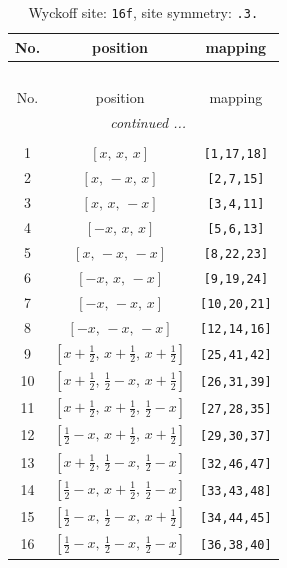 \documentclass[fleqn,8pt]{jsarticle}
\begin{document}
\begin{longtable}{ccc}
\caption{Wyckoff site: {\tt 16f}, site symmetry: {\tt .3.}}
 \\
 \hline \hline
No. & position & mapping \\ \hline \endfirsthead

\multicolumn{2}{l}{\tablename\ \thetable{}} \\
 \hline \hline
No. & position & mapping \\ \hline \endhead

 \hline \hline
\multicolumn{2}{r}{\footnotesize\it continued ...} \\ \endfoot

 \hline \hline
\multicolumn{2}{r}{} \\ \endlastfoot

1 & $\left[ x,\, x,\, x \right]$ & {\tt [1,17,18]} \\ \hline
2 & $\left[ x,\, - x,\, x \right]$ & {\tt [2,7,15]} \\ \hline
3 & $\left[ x,\, x,\, - x \right]$ & {\tt [3,4,11]} \\ \hline
4 & $\left[ - x,\, x,\, x \right]$ & {\tt [5,6,13]} \\ \hline
5 & $\left[ x,\, - x,\, - x \right]$ & {\tt [8,22,23]} \\ \hline
6 & $\left[ - x,\, x,\, - x \right]$ & {\tt [9,19,24]} \\ \hline
7 & $\left[ - x,\, - x,\, x \right]$ & {\tt [10,20,21]} \\ \hline
8 & $\left[ - x,\, - x,\, - x \right]$ & {\tt [12,14,16]} \\ \hline
9 & $\left[ x + \frac{1}{2},\, x + \frac{1}{2},\, x + \frac{1}{2} \right]$ & {\tt [25,41,42]} \\ \hline
10 & $\left[ x + \frac{1}{2},\, \frac{1}{2} - x,\, x + \frac{1}{2} \right]$ & {\tt [26,31,39]} \\ \hline
11 & $\left[ x + \frac{1}{2},\, x + \frac{1}{2},\, \frac{1}{2} - x \right]$ & {\tt [27,28,35]} \\ \hline
12 & $\left[ \frac{1}{2} - x,\, x + \frac{1}{2},\, x + \frac{1}{2} \right]$ & {\tt [29,30,37]} \\ \hline
13 & $\left[ x + \frac{1}{2},\, \frac{1}{2} - x,\, \frac{1}{2} - x \right]$ & {\tt [32,46,47]} \\ \hline
14 & $\left[ \frac{1}{2} - x,\, x + \frac{1}{2},\, \frac{1}{2} - x \right]$ & {\tt [33,43,48]} \\ \hline
15 & $\left[ \frac{1}{2} - x,\, \frac{1}{2} - x,\, x + \frac{1}{2} \right]$ & {\tt [34,44,45]} \\ \hline
16 & $\left[ \frac{1}{2} - x,\, \frac{1}{2} - x,\, \frac{1}{2} - x \right]$ & {\tt [36,38,40]} \\
\end{longtable}
\end{document}
